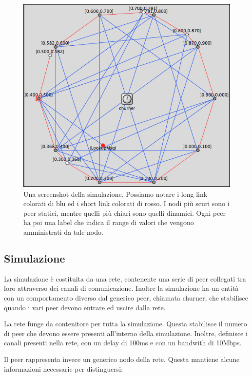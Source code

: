 \documentclass[prodmode,acmtap]{acmlarge}
\begin{document}
\begin{figure}
\begin{center}
\includegraphics[scale=0.42]{imgs/screenshot.png}
\caption{Una screenshot della simulazione. Possiamo notare i long link colorati di blu ed i short link colorati di rosso. I nodi più scuri sono i peer statici, mentre quelli più chiari sono quelli dinamici. Ogni peer ha poi una label che indica il range di valori che vengono amministrati da tale nodo.}
\end{center}
\end{figure}

\subsection{Simulazione}

La simulazione è costituita da una rete, contenente una serie di peer collegati tra loro attraverso dei canali di comunicazione. Inoltre la simulazione ha un entità con un comportamento diverso dal generico peer, chiamata churner, che stabilisce quando i vari peer devono entrare ed uscire dalla rete.

La rete funge da contenitore per tutta la simulazione. Questa stabilisce il numero di peer che devono essere presenti all'interno della simulazione. Inoltre, definisce i canali presenti nella rete, con un delay di 100ms e con un bandwith di 10Mbps.

Il peer rappresenta invece un generico nodo della rete. Questa mantiene alcune informazioni necessarie per distinguersi:
\end{document}
